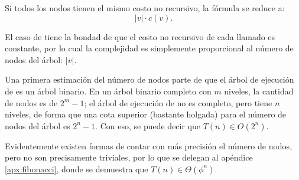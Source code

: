 Si todos los nodos tienen el mismo costo no recursivo, la fórmula se reduce a:
\[|v| \cdot c(v).\]

El caso de  tiene la bondad de que el costo no recursivo de cada llamado es constante, por lo cual la complejidad es simplemente proporcional al número de nodos del árbol: \(|v|\). 

Una primera estimación del número de nodos parte de que el árbol de ejecución de  es un árbol binario. En un árbol binario completo con \(m\) niveles, la cantidad de nodos es de \(2^m - 1\); el árbol de ejecución de  no es completo, pero tiene \(n\) niveles, de forma que una cota superior (bastante holgada) para el número de nodos del árbol es \(2^n - 1\). Con eso, se puede decir que \(T(n) \in O(2^n)\). 

Evidentemente existen formas de contar con más precisión el número de nodos, pero no son precisamente triviales, por lo que se delegan al apéndice \ref{apx:fibonacci}, donde se demuestra que \(T(n) \in \Theta(\phi^n)\).

